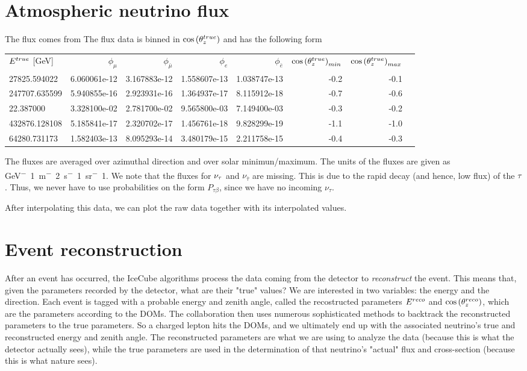 \documentclass[draft=True]{thesis}
\begin{document}
\section{Atmospheric neutrino flux}
The flux comes from \cite{hondapaper} %
The flux data is binned in $\cos{(\theta_z^{true})}$ and has the following form

\begin{tabular}{lrrrrrrr}
           $E^{true}$ [\si{\GeV}] &        $\phi_\mu$ &     $\phi_\bar{\mu}$ &        $\phi_e$ &     $\phi_{\bar{e}}$ &  $\cos{(\theta_z^{true})}_{min}$ &  $\cos{(\theta_z^{true})}_{max}$\\
       27825.594022 &  6.060061e-12 &  3.167883e-12 &  1.558607e-13 &  1.038747e-13 &   -0.2 &   -0.1 \\
      247707.635599 &  5.940855e-16 &  2.923931e-16 &  1.364937e-17 &  8.115912e-18 &   -0.7 &   -0.6 \\
         22.387000 &  3.328100e-02 &  2.781700e-02 &  9.565800e-03 &  7.149400e-03 &   -0.3 &   -0.2 \\
      432876.128108 &  5.185841e-17 &  2.320702e-17 &  1.456761e-18 &  9.828299e-19 &   -1.1 &   -1.0 \\
       64280.731173 &  1.582403e-13 &  8.095293e-14 &  3.480179e-15 &  2.211758e-15 &   -0.4 &   -0.3 \\
\end{tabular}

The fluxes are averaged over azimuthal direction and over solar minimun/maximum. The units of the fluxes are given as \si{\GeV^-1 \metre^-2 \second^-1 \steradian^-1}. 
We note that the fluxes for $\nu_\tau$ and $\nu_\bar{\tau}$ are missing. This is due to the rapid decay (and hence, low flux) of the $\tau$. Thus, we never have to use probabilities on the form 
$P_{\tau \beta}$, since we have no incoming $\nu_\tau$. 

After interpolating this data, we can plot the raw data together with its interpolated values.


\section{Event reconstruction}
After an event has occurred, the IceCube algorithms process the data coming from the detector to \emph{reconstruct} the event. This means that, given the parameters recorded by the detector, what are their "true" values?
We are interested in two variables: the energy and the direction. Each event is tagged with a probable energy and zenith angle, called the recostructed parameters $E^{reco}$ and $\cos{(\theta_z^{reco})}$, which are the parameters according to the DOMs.
The collaboration then uses numerous sophisticated methods to backtrack the reconstructed parameters to the true parameters. So a charged lepton hits the DOMs, and we ultimately end up with the associated neutrino's true and reconstructed energy and zenith angle. The reconstructed parameters are what we are using to analyze the data (because this is what the detector actually sees), while the true parameters are used in the determination of that neutrino's "actual" flux and cross-section (because this is what nature sees).
\end{document}
